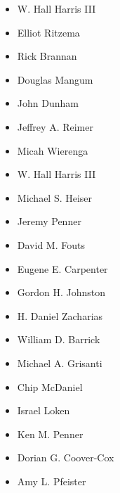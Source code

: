 \begin{multicols}{3}
\begin{headings}
\vspace{-\topsep}
\begin{itemize}[rightmargin=0.125in, leftmargin=0.125in]
\fontsize{9.5pt}{11pt}\selectfont
\setlength{\parskip}{0pt} \setlength{\itemsep}{0pt plus 1pt}
\setlength{\columnsep}{0}
    \item W. Hall Harris III
    \item Elliot Ritzema
    \item Rick Brannan
    \item Douglas Mangum
    \item John Dunham
    \item Jeffrey A. Reimer
    \item Micah Wierenga
    \item W. Hall Harris III
    \item Michael S. Heiser
    \item Jeremy Penner
    \item David M. Fouts
    \item Eugene E. Carpenter
    \item Gordon H. Johnston
    \item H. Daniel Zacharias
    \item William D. Barrick
    \item Michael A. Grisanti
    \item Chip McDaniel
    \item Israel Loken
    \item Ken M. Penner
    \item Dorian G. Coover-Cox
    \item Amy L. Pfeister
    \vfill
\end{itemize}

\vspace{-\topsep}
\end{headings}
\end{multicols}

